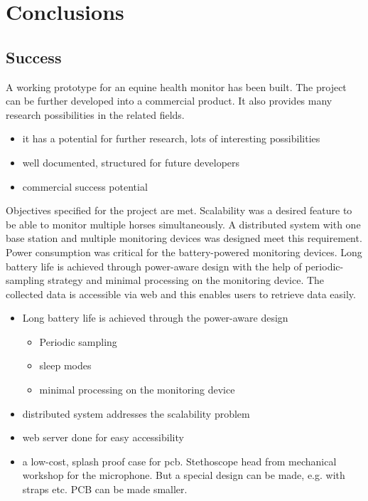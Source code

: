 \chapter{Conclusions}
\section{Success}
A working prototype for an equine health monitor has been built. The project can be further developed into a commercial product. It also provides many research possibilities in the related fields. 

\begin{itemize}
\item it has a potential for further research, lots of interesting possibilities
\item well documented, structured for future developers
\item commercial success potential
\end{itemize}


Objectives specified for the project are met. Scalability was a desired feature to be able to monitor multiple horses simultaneously. A distributed system with one base station and multiple monitoring devices was designed meet this requirement. Power consumption was critical for the battery-powered monitoring devices. Long battery life is achieved through power-aware design with the help of periodic-sampling strategy and minimal processing on the monitoring device. The collected data is accessible via web and this enables users to retrieve data easily.  

\begin{itemize}
\item Long battery life is achieved through the power-aware design
\begin{itemize}
\item Periodic sampling
\item sleep modes
\item minimal processing on the monitoring device
\end{itemize}
\item distributed system addresses the scalability problem
\item web server done for easy accessibility
\item a low-cost, splash proof case for pcb. Stethoscope head from mechanical workshop for the microphone. But a special design can be made, e.g. with straps etc. PCB can be made smaller.
\end{itemize}

